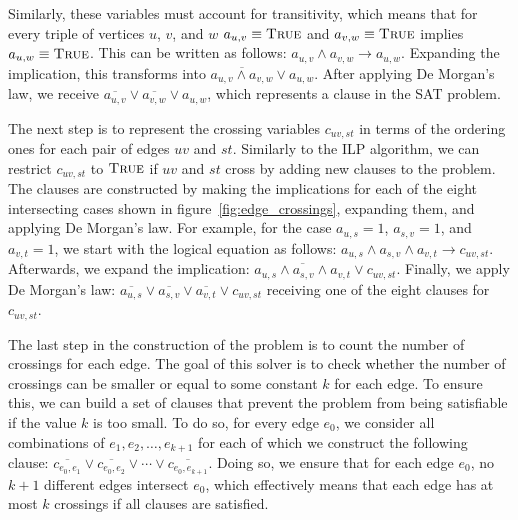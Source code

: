 Similarly, these variables must account for transitivity, which means that for every triple of vertices $u$, $v$, and $w$ $a_{u, v} \equiv \textsc{True}$ and $a_{v, w} \equiv \textsc{True}$ implies $a_{u, w} \equiv \textsc{True}$.
This can be written as follows: $a_{u, v} \land a_{v, w} \rightarrow a_{u, w}$.
Expanding the implication, this transforms into $\overline{a_{u, v} \land a_{v, w}} \lor a_{u, w}$.
After applying De Morgan's law, we receive $\overline{a_{u, v}} \lor \overline{a_{v, w}} \lor a_{u, w}$, which represents a clause in the SAT problem.

The next step is to represent the crossing variables $c_{uv, st}$ in terms of the ordering ones for each pair of edges $uv$ and $st$.
Similarly to the ILP algorithm, we can restrict $c_{uv, st}$ to $\textsc{True}$ if $uv$ and $st$ cross by adding new clauses to the problem.
The clauses are constructed by making the implications for each of the eight intersecting cases shown in figure~\ref{fig:edge_crossings}, expanding them, and applying De Morgan's law.
For example, for the case $a_{u,s} = 1$, $a_{s,v} = 1$, and $a_{v,t} = 1$, we start with the logical equation as follows: $a_{u,s} \land a_{s,v} \land a_{v,t} \rightarrow c_{uv, st}$.
Afterwards, we expand the implication: $\overline{a_{u,s} \land a_{s,v} \land a_{v,t}} \lor c_{uv, st}$.
Finally, we apply De Morgan's law: $\overline{a_{u,s}} \lor \overline{a_{s,v}} \lor \overline{a_{v,t}} \lor c_{uv, st}$ receiving one of the eight clauses for $c_{uv, st}$.

The last step in the construction of the problem is to count the number of crossings for each edge.
The goal of this solver is to check whether the number of crossings can be smaller or equal to some constant $k$ for each edge.
To ensure this, we can build a set of clauses that prevent the problem from being satisfiable if the value $k$ is too small.
To do so, for every edge $e_0$, we consider all combinations of $e_1, e_2, \dots, e_{k+1}$ for each of which we construct the following clause: $\overline{c_{e_0, e_1}} \lor \overline{c_{e_0, e_2}} \lor \cdots\lor \overline{c_{e_0, e_{k+1}}}$.
Doing so, we ensure that for each edge $e_0$, no $k + 1$ different edges intersect $e_0$, which effectively means that each edge has at most $k$ crossings if all clauses are satisfied.


